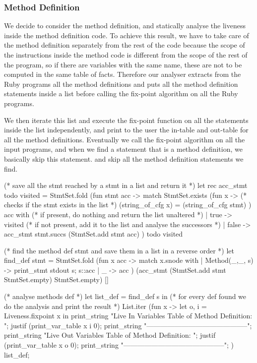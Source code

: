 \documentclass[a4paper]{article}   %
\begin{document}
\subsubsection{Method Definition}
We decide to consider the method definition, and statically analyse the liveness inside the method definition code. To achieve this result, we have to take care of the method definition separately from the rest of the code because the scope of the instructions inside the method code is different from the scope of 
the rest of 
%
the program, so if there are variables with the same name, these are not to be computed in the same table of facts.
Therefore our analyser extracts from the Ruby programs all the method definitions and puts all the method definition statements inside a list before calling the fix-point algorithm on all the Ruby programs.
%

We then iterate this list and execute the fix-point function on all the statements inside the list independently, and print to the user the in-table and out-table for all the method definitions. 
Eventually
%
we call the fix-point algorithm on all the input programs, 
and when we find a statement that is a method definition, we basically skip this statement.
and skip all the method definition statements we find.
%

\begin{ocaml}
(* save all the stmt reached by a stmt in a list and return it *)
let rec acc_stmt todo visited =
  StmtSet.fold (fun stmt acc ->
      match StmtSet.exists (fun x -> 
        (* checks if the stmt exists in the list *)
        (string_of_cfg x) = (string_of_cfg stmt)
      ) acc with
      (* if present, do nothing and return the list unaltered *)
      | true -> visited
      (* if not present, add it to the list and analyse the successors *)
      | false -> acc_stmt stmt.succs (StmtSet.add stmt acc)
  ) todo visited


(* find the method def stmt and save them in a list in a reverse order *)
let find_def stmt =
  StmtSet.fold (fun x acc -> 
      match x.snode with
      | Method(_,_, s) -> print_stmt stdout s; s::acc
      | _ -> acc
  ) (acc_stmt (StmtSet.add stmt StmtSet.empty) StmtSet.empty) []
  
  
(* analyse methods def *)
let list_def = find_def s in
    (* for every def found we do the analysis and print the result *)
    List.iter (fun x -> let o, i = Liveness.fixpoint x in
        print_string "Live In Variables Table of Method Definition: \n \n";
        justif (print_var_table x i 0); 
        print_string "--------------------------------------------\n\n";  
        print_string "Live Out Variables Table of Method Definition: \n \n";
        justif (print_var_table x o 0);
        print_string "--------------------------------------------\n\n";  
    ) list_def;
\end{ocaml}
\end{document}
